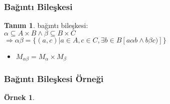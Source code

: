 \documentclass[dvipsnames]{beamer}
\theoremstyle{definition}
\newtheorem{tanim}[theorem]{Tanım}
\theoremstyle{example}
\newtheorem{ornek}[theorem]{Örnek}
\theoremstyle{plain}
\begin{document}
\begin{frame}
  \frametitle{Bağıntı Bileşkesi}

  \begin{tanim}
    \alert{bağıntı bileşkesi}:\\
      $\alpha \subseteq A \times B \wedge \beta \subseteq B \times C$\\
      $\Rightarrow \alpha \beta = \{(a,c) | a \in A, c \in C,
                \exists b \in B [a \alpha b \wedge b \beta c)]\}$
  \end{tanim}

  \pause
  \begin{itemize}
    \item $M_{\alpha \beta} = M_{\alpha} \times M_{\beta}$
  \end{itemize}
\end{frame}

\begin{frame}
  \frametitle{Bağıntı Bileşkesi Örneği}

  \begin{ornek}
    \begin{columns}
      \begin{center}
      \end{center}

      \begin{center}
      \end{center}
    \end{columns}
  \end{ornek}
\end{frame}
\end{document}
